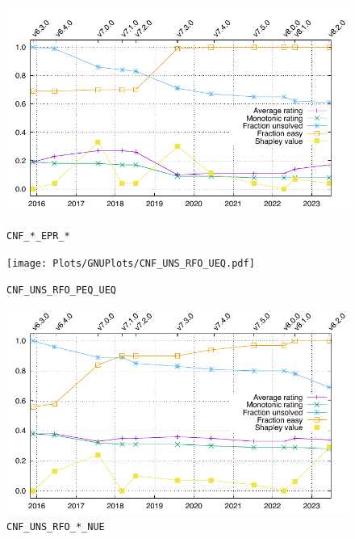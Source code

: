 \documentclass[runningheads]{llncs}
\begin{document}
\begin{figure}[h!]
\centering
\begin{minipage}[t]{.49\textwidth}
  \centering
  \includegraphics[width=\textwidth]{Plots/GNUPlots/CNF_EPR.pdf}
  \vspace*{-2em}
  \caption{{\tt CNF\_*\_EPR\_*}}
  \label{Plot_CNF_EPR}
\end{minipage}
\begin{minipage}[t]{.49\textwidth}
  \centering
  \texttt{[image: Plots/GNUPlots/CNF\_UNS\_RFO\_UEQ.pdf]}
  \vspace*{-2em}
  \caption{{\tt CNF\_UNS\_RFO\_PEQ\_UEQ}}
  \label{Plot_CNF_UEQ}
\end{minipage}
\begin{minipage}[t]{.49\textwidth}
  \centering
  \includegraphics[width=\textwidth]{Plots/GNUPlots/CNF_UNS_RFO_NUE.pdf}
  \vspace*{-2em}
  \caption{{\tt CNF\_UNS\_RFO\_*\_NUE}}
  \label{Plot_CNF_UNS}
\end{minipage}
\begin{minipage}[t]{.49\textwidth}

\end{minipage}
\end{figure}
\end{document}
